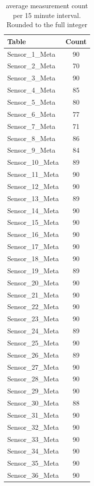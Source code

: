 \begin{table}
	\centering
	\begin{tabular}{l|c}
		Table & Count \\
		\hline
		 Sensor\_1\_Meta  & 90\\ \hline
		 Sensor\_2\_Meta  & 70\\ \hline
		 Sensor\_3\_Meta  & 90\\ \hline
		 Sensor\_4\_Meta  & 85\\ \hline
		 Sensor\_5\_Meta  & 80\\ \hline
		 Sensor\_6\_Meta  & 77\\ \hline
		 Sensor\_7\_Meta  & 71\\ \hline
		 Sensor\_8\_Meta  & 86\\ \hline
		 Sensor\_9\_Meta  & 84\\ \hline
		 Sensor\_10\_Meta  & 89\\ \hline
		 Sensor\_11\_Meta  & 90\\ \hline
		 Sensor\_12\_Meta  & 90\\ \hline
		 Sensor\_13\_Meta  & 89\\ \hline
		 Sensor\_14\_Meta  & 90\\ \hline
		 Sensor\_15\_Meta  & 90\\ \hline
		 Sensor\_16\_Meta  & 90\\ \hline
		 Sensor\_17\_Meta  & 90\\ \hline
		 Sensor\_18\_Meta  & 90\\ \hline
		 Sensor\_19\_Meta  & 89\\ \hline
		 Sensor\_20\_Meta  & 90\\ \hline 
		 Sensor\_21\_Meta  & 90\\ \hline
		 Sensor\_22\_Meta  & 90\\ \hline
		 Sensor\_23\_Meta  & 90\\ \hline
		 Sensor\_24\_Meta  & 89\\ \hline
		 Sensor\_25\_Meta  & 90\\ \hline
		 Sensor\_26\_Meta  & 89\\ \hline
		 Sensor\_27\_Meta  & 90\\ \hline
		 Sensor\_28\_Meta  & 90\\ \hline
		 Sensor\_29\_Meta  & 90\\ \hline
		 Sensor\_30\_Meta  & 88\\ \hline
		 Sensor\_31\_Meta  & 90\\ \hline
		 Sensor\_32\_Meta  & 90\\ \hline
		 Sensor\_33\_Meta  & 90\\ \hline
		 Sensor\_34\_Meta  & 90\\ \hline
		 Sensor\_35\_Meta  & 90\\ \hline
		 Sensor\_36\_Meta  & 90\\ \hline
	\end{tabular}
	\caption{average measurement count per 15 minute interval. Rounded to the full integer}
	\label{tab:counts}
\end{table}

